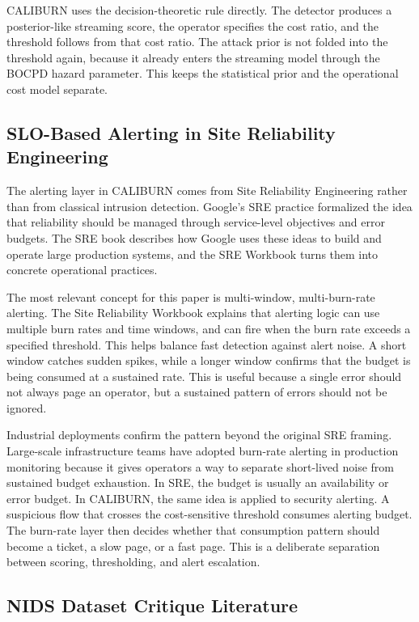 \documentclass[preprint,12pt,authoryear]{elsarticle}
\newcommand{\caliburn}{CALIBURN}
\begin{document}
\caliburn{} uses the decision-theoretic rule directly. The detector produces a posterior-like streaming score, the operator specifies the cost ratio, and the threshold follows from that cost ratio. The attack prior is not folded into the threshold again, because it already enters the streaming model through the BOCPD hazard parameter. This keeps the statistical prior and the operational cost model separate.

\subsection{SLO-Based Alerting in Site Reliability Engineering}
\label{sec:bg-slo}

The alerting layer in \caliburn{} comes from Site Reliability Engineering rather than from classical intrusion detection. Google's SRE practice formalized the idea that reliability should be managed through service-level objectives and error budgets. The SRE book \citep{beyer2016sre} describes how Google uses these ideas to build and operate large production systems, and the SRE Workbook \citep{beyer2018workbook} turns them into concrete operational practices.

The most relevant concept for this paper is multi-window, multi-burn-rate alerting. The Site Reliability Workbook explains that alerting logic can use multiple burn rates and time windows, and can fire when the burn rate exceeds a specified threshold. This helps balance fast detection against alert noise. A short window catches sudden spikes, while a longer window confirms that the budget is being consumed at a sustained rate. This is useful because a single error should not always page an operator, but a sustained pattern of errors should not be ignored.

Industrial deployments confirm the pattern beyond the original SRE framing. Large-scale infrastructure teams have adopted burn-rate alerting in production monitoring because it gives operators a way to separate short-lived noise from sustained budget exhaustion. In SRE, the budget is usually an availability or error budget. In \caliburn{}, the same idea is applied to security alerting. A suspicious flow that crosses the cost-sensitive threshold consumes alerting budget. The burn-rate layer then decides whether that consumption pattern should become a ticket, a slow page, or a fast page. This is a deliberate separation between scoring, thresholding, and alert escalation.

\subsection{NIDS Dataset Critique Literature}
\label{sec:bg-datasets}
\end{document}
